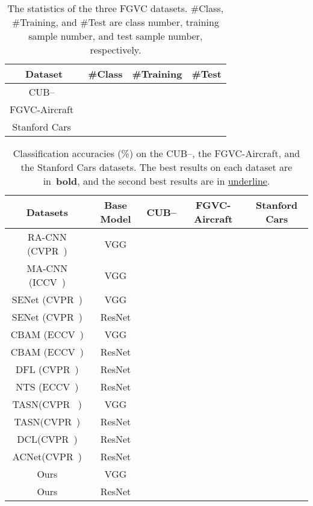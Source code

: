 \documentclass{article}
\begin{document}
\begin{table}[!t]
\vspace{-2.5mm}
    \caption{The statistics of the three FGVC datasets. \#Class, \#Training, and \#Test are class number, training sample number, and test sample number, respectively.}
    \centering
    \begin{tabular}{|c|c|c|c|}
        \hline
        Dataset & \#Class & \#Training & \#Test \\ 
        \hline
        \hline
        CUB--~\cite{birds} &  &  &   \\ 
        \hline
        FGVC-Aircraft~\cite{air} &  &  &  \\
        \hline
        Stanford Cars~\cite{cars} &  &  &   \\
        \hline
    \end{tabular}
     \label{tab:datasets}
\end{table}
\begin{table*}[!t]
    
    \centering
    \caption{Classification accuracies (\%) on the CUB--, the FGVC-Aircraft, and the Stanford Cars datasets. The best results on each dataset are in~\textbf{bold}, and the second best results are in \underline{underline}.}

    \begin{tabular}{|c|c|c|c|c|}
        \hline
        Datasets& Base Model & CUB-- & FGVC-Aircraft & Stanford Cars \\ 
        \hline 
        \hline
        RA-CNN (CVPR~\cite{RA-CNN}) & VGG &  &  & \\
        MA-CNN (ICCV~\cite{MA-CNN}) & VGG & &  & \\
        SENet (CVPR~\cite{SENet}) & VGG &  & &  \\ 
        SENet (CVPR~\cite{SENet}) & ResNet &  &  & \\
        CBAM (ECCV~\cite{CBAM})  & VGG &  &  & \\
        CBAM (ECCV~\cite{CBAM})  & ResNet &  &  & \\
        DFL (CVPR~\cite{DFL}) & ResNet &  &  & \\
        NTS (ECCV~\cite{NTS}) & ResNet &  &  &\\
        TASN(CVPR~\cite{TASN} )& VGG &  &  & \\
        TASN(CVPR~\cite{TASN})& ResNet &  &  & \\
        DCL(CVPR~\cite{DCL})& ResNet &  &  & \\
        ACNet(CVPR~\cite{ACNet})& ResNet &  &  & \\
        \hline
        Ours & VGG &  &  &\\
        Ours & ResNet &  &  &\\
        \hline
    \end{tabular}
    \label{tab:results}
\end{table*}
\vspace{-2mm}
\end{document}
